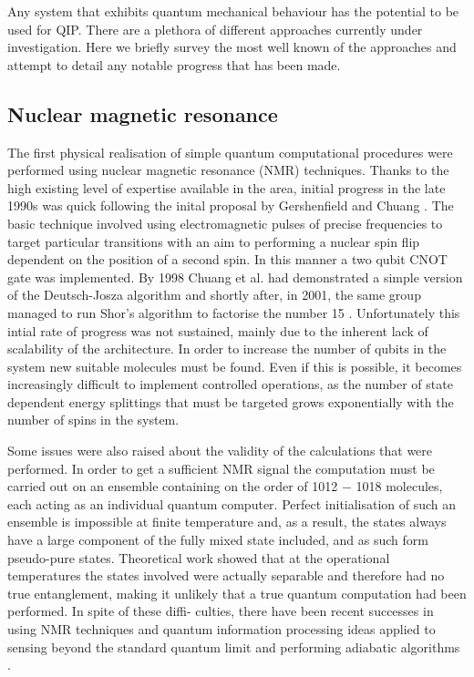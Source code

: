 Any system that exhibits quantum mechanical behaviour has the potential to be used for QIP. There are a plethora of different approaches currently under investigation. Here we briefly survey the most well known of the approaches and attempt to detail any notable progress that has been made.

\subsection{Nuclear magnetic resonance}

The first physical realisation of simple quantum computational procedures were performed using nuclear magnetic resonance (NMR) techniques. Thanks to the high existing level of expertise available in the area, initial progress in the late 1990s was quick following the inital proposal by Gershenfield and Chuang \cite{nmr_proposal_chuang_97}. The basic technique involved using electromagnetic pulses of precise frequencies to target particular transitions with an aim to performing a nuclear spin flip dependent on the position of a second spin. In this manner a two qubit CNOT gate was implemented. By 1998 Chuang et al. had demonstrated a simple version of the Deutsch-Josza algorithm \cite{chuang_first_nmr_realisation_98} and shortly after, in 2001, the same group managed to run Shor’s algorithm to factorise the number 15 \cite{nmr_factorise_15_01}. Unfortunately this intial rate of progress was not sustained, mainly due to the inherent lack of scalability of the architecture. In order to increase the number of qubits in the system new suitable molecules must be found. Even if this is possible, it becomes increasingly difficult to implement controlled operations, as the number of state dependent energy splittings that must be targeted grows exponentially with the number of spins in the system.

Some issues were also raised about the validity of the calculations that were performed. In order to get a sufficient NMR signal the computation must be carried out on an ensemble containing on the order of 1012 − 1018 molecules, each acting as an individual quantum computer. Perfect initialisation of such an ensemble is impossible at finite temperature and, as a result, the states always have a large component of the fully mixed state included, and as such form pseudo-pure states. Theoretical work \cite{nmr_pseudo_pure} showed that at the operational temperatures the states involved were actually separable and therefore had no true entanglement, making it unlikely that a true quantum computation had been performed. In spite of these diffi- culties, there have been recent successes in using NMR techniques and quantum information processing ideas applied to sensing beyond the standard quantum limit \cite{nmr_sensing_09} and performing adiabatic algorithms \cite{nmr_143_factorization}.

